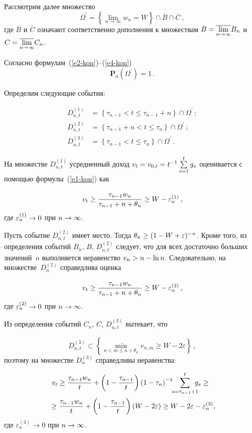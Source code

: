 \begin{multicols}{2}
  Рассмотрим далее множество
  $$
  \Omega^\prime =\left\{ \lim\limits_{n\rightarrow\infty} w_n =W\right\}\cap 
\overline{B}\cap\overline{C}\,,
  $$
где $\overline{B}$ и $\overline{C}$ означают соответственно дополнения к множествам 
$B\hm= \overline{\lim\limits_{n\rightarrow\infty}} B_n$ и $C\hm= 
\overline{\lim\limits_{n\rightarrow\infty}} C_n$.
  
  Согласно формулам~(\ref{e2-kon})--(\ref{e4-kon})
  $$
  \mathbf{P}_{a}\left(\Omega^\prime\right) =1\,.
  $$
  
  Определим следующие события:
  
  \noindent
  \begin{align*}
  D_{n,t}^{(1)} &= \left\{ \tau_{n-1}<t\leq \tau_{n-1}+n\right\} \cap \Omega^\prime\,;\\
  D_{n,t}^{(2)} &= \left\{\tau_{n-1}+n<t\leq \tau_n\right\}\cap \Omega^\prime\,;\\
  D_{n,t}^{(3)} &= \left\{ \tau_{n-1}<t\leq \tau_n\right\} \cap \Omega^\prime\,.
  \end{align*}
  
  На множестве $D_{n,t}^{(1)}$ усредненный доход $v_t\hm=v_{0,t}\hm=
  t^{-1}\sum\limits_{s=1}^t g_s$ оценивается с помощью формулы~(\ref{e1-kon}) как
  
    \noindent
  $$
  v_t\geq \displaystyle\frac{\displaystyle \tau_{n-1} w_n\mathstrut}{\displaystyle \tau_{n-1}+n+\theta_n\mathstrut}\geq W-\varepsilon_n^{(1)}\,,
  $$
где $\varepsilon_n^{(1)}\hm\rightarrow0$ при $n\hm\rightarrow\infty$.
  
  Пусть событие $D_{n,t}^{(2)}$ имеет место. Тогда $\theta_n\geq (1\hm- 
W\hm+\varepsilon)^{-n}$. Кроме того, из определения событий $B_n$, $B$, 
$D_{n,t}^{(2)}$ следует, что для всех достаточно больших значений~$n$ выполняется 
неравенство $v_n\hm> n-\ln n$. Следовательно, на множестве~$D_n^{(2)}$ справедлива 
оценка

  \noindent
  $$
  v_t\geq \displaystyle\frac{\displaystyle \tau_{n-1} w_n\mathstrut}{\displaystyle \tau_{n-1}+n+\theta_n\mathstrut}\geq W-\varepsilon_n^{(2)}\,,
  $$
где $\varepsilon_n^{(2)}\hm\rightarrow0$ при $n\hm\rightarrow\infty$.
  
  Из определения событий $C_n$, $C$, $D_{n,t}^{(3)}$ вытекает, что
  
    \noindent
  $$
  D_{n,t}^{(3)} \subset \left\{ \min\limits_{n<m\leq n+\theta_n} v_{n,m}\geq W-
2\varepsilon\right\}\,,
  $$
поэтому на множестве $D_n^{(3)}$ справедливы неравенства:

  \noindent
\begin{multline*}
\!\!v_t\geq \fr{\tau_{n-1} w_n}{t}+\left(1- \fr{\tau_{n-1}}{t}\right) \left( 1-\tau_n\right)^{-1} 
\!\!\sum\limits_{s=\tau_{n-1}+1}^t \!\!\!\!g_s\geq{}\\
{}\geq \fr{\tau_{n-1} w_n}{t}+\left( 1-\fr{\tau_{n-1}}{t}\right)\left( W-2\varepsilon\right) \geq 
W-2\varepsilon -\varepsilon_n^{(3)},
\end{multline*}
где $\varepsilon_n^{(3)}\rightarrow0$ при $n\hm\rightarrow\infty$.


\end{multicols}
